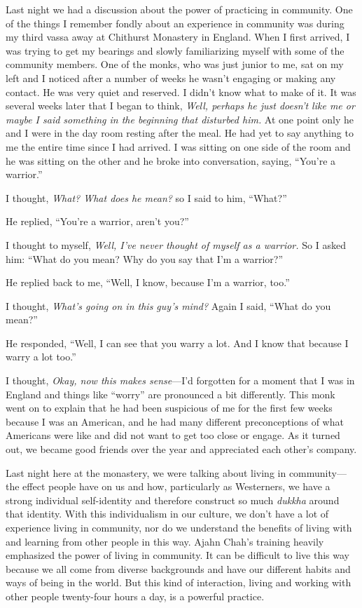 Last night we had a discussion about the power of practicing in 
community. One of the things I remember fondly about an experience in 
community was during my third vassa away at Chithurst Monastery in 
England. When I first arrived, I was trying to get my bearings and 
slowly familiarizing myself with some of the community members. One of 
the monks, who was just junior to me, sat on my left and I noticed 
after a number of weeks he wasn't engaging or making any contact. He 
was very quiet and reserved. I didn't know what to make of it. It was 
several weeks later that I began to think, \emph{Well, perhaps he just 
doesn't like me or maybe I said something in the beginning that 
disturbed him.} At one point only he and I were in the day room resting 
after the meal. He had yet to say anything to me the entire time since 
I had arrived. I was sitting on one side of the room and he was sitting 
on the other and he broke into conversation, saying, ``You're a 
warrior.''

I thought, \emph{What? What does he mean?} so I said to him, ``What?''

He replied, ``You're a warrior, aren't you?''

I thought to myself, \emph{Well, I've never thought of myself as a 
warrior.} So I asked him: ``What do you mean? Why do you say that I'm a 
warrior?''

He replied back to me, ``Well, I know, because I'm a warrior, too.''

I thought, \emph{What's going on in this guy's mind?} Again I said, 
``What do you mean?''

He responded, ``Well, I can see that you warry a lot. And I know that 
because I warry a lot too.''

I thought, \emph{Okay, now this makes sense}---I'd forgotten for a 
moment that I was in England and things like ``worry'' are pronounced a 
bit differently. This monk went on to explain that he had been 
suspicious of me for the first few weeks because I was an American, and 
he had many different preconceptions of what Americans were like and 
did not want to get too close or engage. As it turned out, we became 
good friends over the year and appreciated each other's company.

Last night here at the monastery, we were talking about living in 
community---the effect people have on us and how, particularly as 
Westerners, we have a strong individual self-identity and therefore 
construct so much \emph{dukkha} around that identity. With this 
individualism in our culture, we don't have a lot of experience living 
in community, nor do we understand the benefits of living with and 
learning from other people in this way. Ajahn Chah's training heavily 
emphasized the power of living in community. It can be difficult to 
live this way because we all come from diverse backgrounds and have our 
different habits and ways of being in the world. But this kind of 
interaction, living and working with other people twenty-four hours a 
day, is a powerful practice.

